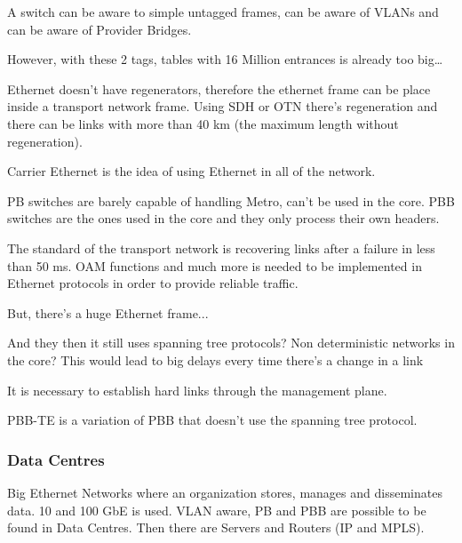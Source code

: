 A switch can be aware to simple untagged frames, can be aware of VLANs and can be aware of Provider Bridges.

However, with these 2 tags, tables with 16 Million entrances is already too big\dots {}

Ethernet doesn't have regenerators, therefore the ethernet frame can be place inside a transport network frame. Using SDH or OTN there's regeneration and there can be links with more than 40 km (the maximum length without regeneration).



Carrier Ethernet is the idea of using Ethernet in all of the network.

PB switches are barely capable of handling Metro, can't be used in the core.
PBB switches are the ones used in the core and they only process their own headers.


The standard of the transport network is recovering links after a failure in less than 50 ms. OAM functions and much more is needed to be implemented in Ethernet protocols in order to provide reliable traffic.

But, there's a huge Ethernet frame...



And they then it still uses spanning tree protocols? Non deterministic networks in the core? This would lead to big delays every time there's a change in a link 

It is necessary to establish hard links through the management plane.

PBB-TE is a variation of PBB that doesn't use the spanning tree protocol.








\subsubsection{Data Centres}
Big Ethernet Networks where an organization stores, manages and disseminates data. 10 and 100 GbE is used. VLAN aware, PB and PBB are possible to be found in Data Centres. Then there are Servers and Routers (IP and MPLS).

